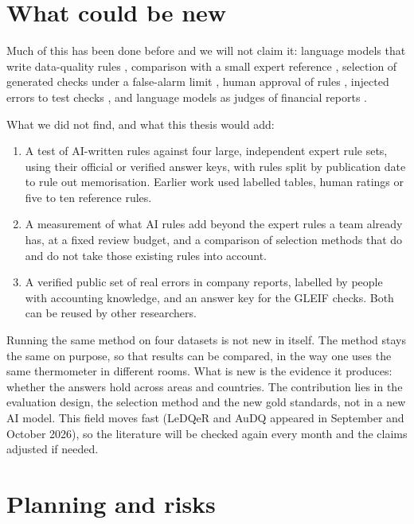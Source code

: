 \documentclass[11pt,a4paper]{article}
\begin{document}
\section{What could be new}

Much of this has been done before and we will not claim it: language models that write data-quality rules \cite{ledqer,audq,akella,schneider}, comparison with a small expert reference \cite{schneider,alexander}, selection of generated checks under a false-alarm limit \cite{spade,autovalidate}, human approval of rules \cite{audq}, injected errors to test checks \cite{homayouni,jenga}, and language models as judges of financial reports \cite{finauditing,secfintables}.

What we did not find, and what this thesis would add:
\begin{enumerate}
\item A test of AI-written rules against four large, independent expert rule sets, using their official or verified answer keys, with rules split by publication date to rule out memorisation. Earlier work used labelled tables, human ratings or five to ten reference rules.
\item A measurement of what AI rules add beyond the expert rules a team already has, at a fixed review budget, and a comparison of selection methods that do and do not take those existing rules into account.
\item A verified public set of real errors in company reports, labelled by people with accounting knowledge, and an answer key for the GLEIF checks. Both can be reused by other researchers.
\end{enumerate}

Running the same method on four datasets is not new in itself. The method stays the same on purpose, so that results can be compared, in the way one uses the same thermometer in different rooms. What is new is the evidence it produces: whether the answers hold across areas and countries. The contribution lies in the evaluation design, the selection method and the new gold standards, not in a new AI model. This field moves fast (LeDQeR and AuDQ appeared in September and October 2026), so the literature will be checked again every month and the claims adjusted if needed.

\section{Planning and risks}
\end{document}
